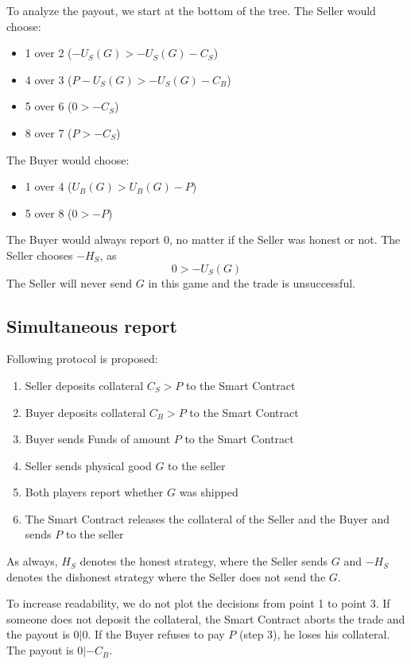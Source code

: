 \documentclass{cacthesis}
\begin{document}
To analyze the payout, we start at the bottom of the tree. The Seller would choose:
\begin{itemize}
    \item 1 over 2 ($-U_S(G) > -U_S(G) -C_S$)
    \item 4 over 3 ($P -U_S(G) > -U_S(G) -C_B$)
    \item 5 over 6 ($0 > -C_S$)
    \item 8 over 7 ($P >-C_S$)
\end{itemize}
The Buyer would choose:
\begin{itemize}
    \item 1 over 4 ($U_B(G) > U_B(G) - P$)
    \item 5 over 8 ($0 > -P$)
\end{itemize}
The Buyer would always report 0, no matter if the Seller was honest or not.\newline
The Seller chooses $-H_S$, as 
\[0>-U_S(G)\]
The Seller will never send $G$ in this game and the trade is unsuccessful.

\subsection{Simultaneous report}
Following protocol is proposed:
\begin{enumerate}
    \item Seller deposits collateral $C_S > P$ to the Smart Contract
    \item Buyer deposits collateral $C_B > P$ to the Smart Contract
    \item Buyer sends Funds of amount $P$ to the Smart Contract
    \item Seller sends physical good $G$ to the seller
    \item Both players report whether $G$ was shipped
    \item The Smart Contract releases the collateral of the Seller and the Buyer and sends $P$ to the seller
\end{enumerate}
As always, $H_S$ denotes the honest strategy, where the Seller sends $G$ and $-H_S$ denotes the dishonest strategy where the Seller does not send the $G$.

To increase readability, we do not plot the decisions from point 1 to point 3. If someone does not deposit the collateral, the Smart Contract aborts the trade and the payout is $0|0$. If the Buyer refuses to pay $P$ (step 3), he loses his collateral. The payout is $0|-C_B$.\newline
\end{document}

